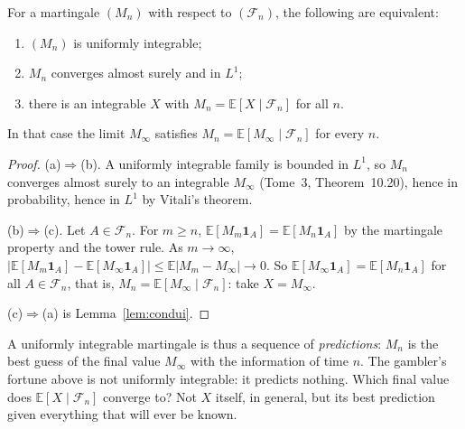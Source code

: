 \begin{theorem}\label{thm:uimart}
For a martingale $(M_n)$ with respect to $(\mathcal F_n)$, the following are equivalent:
\begin{enumerate}[label=(\alph*)]
\item $(M_n)$ is uniformly integrable;
\item $M_n$ converges almost surely and in $L^1$;
\item there is an integrable $X$ with $M_n=\mathbb E[X\mid\mathcal F_n]$ for all $n$.
\end{enumerate}
In that case the limit $M_\infty$ satisfies $M_n=\mathbb E[M_\infty\mid\mathcal F_n]$ for every $n$.
\end{theorem}
\begin{proof}
(a)$\Rightarrow$(b). A uniformly integrable family is bounded in $L^1$, so $M_n$ converges almost surely to an integrable $M_\infty$ (Tome~3, Theorem~10.20), hence in probability, hence in $L^1$
by Vitali's theorem.

(b)$\Rightarrow$(c). Let $A\in\mathcal F_n$. For $m\ge n$, $\mathbb E[M_m\mathbf 1_A]=\mathbb E[M_n\mathbf 1_A]$ by the martingale property and the tower rule. As $m\to\infty$,
$|\mathbb E[M_m\mathbf 1_A]-\mathbb E[M_\infty\mathbf 1_A]|\le\mathbb E|M_m-M_\infty|\to0$. So $\mathbb E[M_\infty\mathbf 1_A]=\mathbb E[M_n\mathbf 1_A]$ for all $A\in\mathcal F_n$, that is, $M_n=\mathbb E[M_\infty\mid\mathcal F_n]$: take $X=M_\infty$.

(c)$\Rightarrow$(a) is Lemma~\ref{lem:condui}.
\end{proof}

A uniformly integrable martingale is thus a sequence of \emph{predictions}: $M_n$ is the best guess of the final value $M_\infty$ with the information of time $n$. The gambler's
fortune above is not uniformly integrable: it predicts nothing. Which final value does $\mathbb E[X\mid\mathcal F_n]$ converge to? Not $X$ itself, in general, but its best
prediction given everything that will ever be known.

